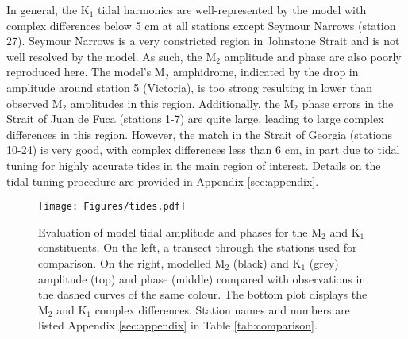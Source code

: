 \documentclass{tATO2e}
\begin{document}
In general, the K$_1$ tidal harmonics are well-represented by the model with complex differences below 5 cm at all stations except Seymour Narrows (station 27). Seymour Narrows is a very constricted region in Johnstone Strait and is not well resolved by the model. As such, the M$_2$ amplitude and phase are also poorly reproduced here. The model's M$_2$ amphidrome, indicated by the drop in amplitude around station 5 (Victoria), is too strong resulting in lower than observed M$_2$ amplitudes in this region. Additionally, the M$_2$ phase errors in the Strait of Juan de Fuca (stations 1-7) are quite large, leading to large complex differences in this region.  However, the match in the Strait of Georgia (stations 10-24) is very good, with complex differences less than 6 cm, in part due to tidal tuning for highly accurate tides in the main region of interest. Details on the tidal tuning procedure are provided in Appendix \ref{sec:appendix}.


\begin{figure}
\centering
\texttt{[image: Figures/tides.pdf]}
\caption{Evaluation of model tidal amplitude and phases for the M$_2$ and K$_1$ constituents. On the left, a transect through the stations used for comparison. On the right, modelled M$_2$ (black) and K$_1$ (grey) amplitude (top) and phase (middle) compared with observations in the dashed curves of the same colour. The bottom plot displays the M$_2$ and K$_1$ complex differences. Station names and numbers are listed Appendix \ref{sec:appendix} in Table \ref{tab:comparison}.}
\label{fig:tides}
\end{figure}
\end{document}
